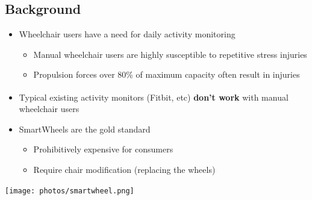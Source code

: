 \documentclass[a0,landscape]{a0poster}
\newenvironment{Figure}
  {\par\medskip\noindent\minipage{\linewidth}}
  {\endminipage\par\medskip}
\begin{document}
\vspace{4cm}

\begin{multicols*}{3}
\large

\section*{Background}
\begin{minipage}[t]{0.5\columnwidth}
    \begin{itemize}
        \item Wheelchair users have a need for daily activity monitoring
            \begin{itemize}
                \item Manual wheelchair users are highly susceptible to repetitive stress injuries \cite{mercer06}
                \item Propulsion forces over 80\% of maximum capacity often result in injuries \cite{hills11}
            \end{itemize}
        \item Typical existing activity monitors (Fitbit\textsuperscript{\textregistered}, etc) \textbf{don't work} with manual wheelchair users
        \item SmartWheels are the gold standard \cite{asato93,cowan08}
            \begin{itemize}
                \item Prohibitively expensive for consumers
                \item Require chair modification (replacing the wheels)
            \end{itemize}
    \end{itemize}
\end{minipage}
\hspace{0.05\columnwidth}%
\begin{minipage}[t]{0.45\columnwidth}
    \begin{Figure}
        \centering
        \texttt{[image: photos/smartwheel.png]}
        \label{fig:smartwheel}
    \end{Figure}
\end{minipage}


\end{multicols*}
\end{document}
